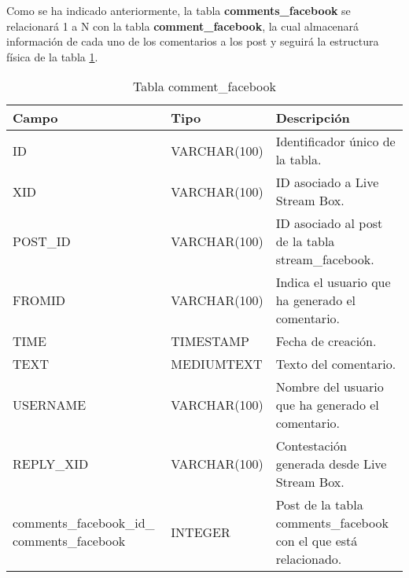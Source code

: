 Como se ha indicado anteriormente, la tabla \textbf{comments\_facebook} se relacionará 1 a N con la tabla \textbf{comment\_facebook}, la cual almacenará información de cada uno de los comentarios a los post y seguirá la estructura física de la tabla \ref{tabCommentFacebook}.
\bigskip
\par
\begin{table}[h]
\begin{center}
\begin{tabular}{| p{50mm}  | l | p{60mm} |}\hline
\textbf{Campo}&\textbf{Tipo}&\textbf{Descripción} \\ \hline
ID & VARCHAR(100) & Identificador único de la tabla. \\ \hline
XID & VARCHAR(100) & ID asociado a Live Stream Box. \\ \hline
POST\_ID & VARCHAR(100) & ID asociado al post de la tabla stream\_facebook. \\ \hline
FROMID & VARCHAR(100) & Indica el usuario que ha generado el comentario. \\ \hline
TIME & TIMESTAMP & Fecha de creación. \\ \hline
TEXT & MEDIUMTEXT & Texto del comentario. \\ \hline
USERNAME & VARCHAR(100) & Nombre del usuario que ha generado el comentario. \\ \hline
REPLY\_XID & VARCHAR(100) & Contestación generada desde Live Stream Box. \\ \hline
comments\_facebook\_id\_ comments\_facebook & INTEGER & Post de la tabla comments\_facebook con el que está relacionado. \\ \hline
\end{tabular}
\end{center}
\caption{Tabla comment\_facebook} \label{tabCommentFacebook}
\end{table}

